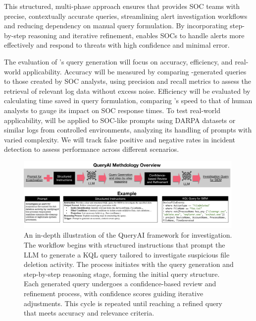 This structured, multi-phase approach ensures that \Sysb provides SOC teams with precise, contextually accurate queries, streamlining alert investigation workflows and reducing dependency on manual query formulation. By incorporating step-by-step reasoning and iterative refinement, \Sysb enables SOCs to handle alerts more effectively and respond to threats with high confidence and minimal error.

\eval The evaluation of \Sysb’s query generation will focus on accuracy, efficiency, and real-world applicability. Accuracy will be measured by comparing \Sysb-generated queries to those created by SOC analysts, using precision and recall metrics to assess the retrieval of relevant log data without excess noise. Efficiency will be evaluated by calculating time saved in query formulation, comparing \Sysb’s speed to that of human analysts to gauge its impact on SOC response times. To test real-world applicability, \Sysb will be applied to SOC-like prompts using DARPA datasets \cite{darpatc, darpaoptc} or similar logs from controlled environments, analyzing its handling of prompts with varied complexity. We will track false positive and negative rates in incident detection to assess performance across different scenarios.




\begin{figure}[t!]
        \centering \includegraphics[width=0.99\textwidth]{fig/kql-query.pdf}
        \caption{An in-depth illustration of the QueryAI framework for investigation. The workflow begins with structured instructions that prompt the LLM to generate a KQL query tailored to investigate suspicious file deletion activity. The process initiates with the query generation and step-by-step reasoning stage, forming the initial query structure. Each generated query undergoes a confidence-based review and refinement process, with confidence scores guiding iterative adjustments. This cycle is repeated until reaching a refined query that meets accuracy and relevance criteria.}
        \label{fig:kqlquery}
\end{figure}


